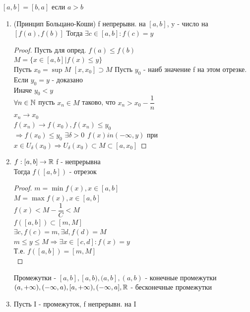 \begin{consequence}
	$ [a, b] = [b,a] $ если $ a > b $
	\begin{enumerate}
		\item (Принцип Больцано-Коши) f непрерывн. на $[a, b] $, y - число на $ [f(a), f(b)] $ Тогда $ \exists c \in [a, b]  : f(c) = y$ %
		\begin{proof}
			Пусть для опред. $ f(a) \leq f(b) $\\
			$ M = \{ x \in [a, b] | f(x) \leq y \} $\\
			Пусть $ x_0 = \sup M$ 
			$ [x, x_0] \supset M $ Пусть $y_0 $ - наиб значение f на этом отрезке. Если $ y_0 = y $ - доказано \\
			Иначе $ y_0 < y $ \\
			$ \forall n \in \mathbb{N} $ пусть $ x_n \in M $ таково, что $x_n> x_0 - \dfrac{1}{n} $  \\
			$ x_n \rightarrow x_0 $ \\
			$ f(x_n) \rightarrow f(x_0), f(x_n) \leq y_0 $\\
			$ \Rightarrow f(x_0) \leq y_0 $%
			$ \exists \delta > 0  \ \ f(x) in (-\infty, y) $ при $x \in U_{\delta} (x_0) \Rightarrow U_\delta (x_0) \subset M \subset [a, x_0] $ 			
		\end{proof}
		\item $ f: [a, b]  \rightarrow \mathbb{R} $ f - непрерывна \\
		Тогда $ f([a, b] ) $ - отрезок \\
		\begin{proof}
			$ m = \min f(x), x \in [a, b] $ \\
			$ M = \max f(x), x \in [a, b]  $  \\
			$f(x) < M - \dfrac{1}{C} < M $ \\
			$ f( [a, b] ) \subset{[m, M]} $ \\
			$ \exists c, f(c) = m, \exists d, f(d) = M $ \\
			$ m \leq y \leq M \Rightarrow \exists x \in [c,d] : f(x) = y $ \\
			Т.е. $ f([a, b] ) = [m, M] $ \\ 
		\end{proof}
		Промежутки - $ [a,b], [a, b), (a, b], (a, b) $ - конечные промежутки\\
		$ (a, + \infty), (-\infty, a), [a, + \infty), (-\infty, a], \mathbb{R} $ - бесконечные промежутки \\
		\item Пусть I - промежуток,  f непрерывн. на I \\

\end{enumerate}
\end{consequence}
